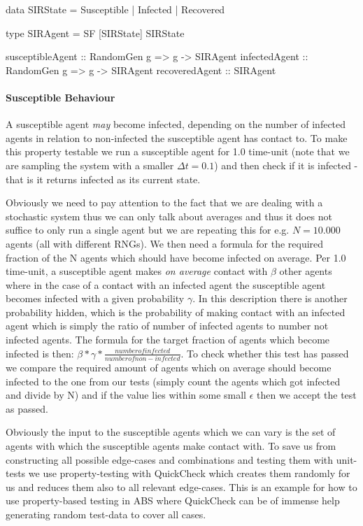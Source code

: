\begin{HaskellCode}
data SIRState 
  = Susceptible 
  | Infected 
  | Recovered
  
type SIRAgent = SF [SIRState] SIRState

susceptibleAgent :: RandomGen g => g -> SIRAgent
infectedAgent :: RandomGen g => g -> SIRAgent
recoveredAgent :: SIRAgent
\end{HaskellCode}

\paragraph{Susceptible Behaviour}
A susceptible agent \textit{may} become infected, depending on the number of infected agents in relation to non-infected the susceptible agent has contact to. To make this property testable we run a susceptible agent for 1.0 time-unit (note that we are sampling the system with a smaller $\Delta t = 0.1$) and then check if it is infected - that is it returns infected as its current state.

Obviously we need to pay attention to the fact that we are dealing with a stochastic system thus we can only talk about averages and thus it does not suffice to only run a single agent but we are repeating this for e.g. $N = 10.000$ agents (all with different RNGs). We then need a formula for the required fraction of the N agents which should have become infected on average. Per 1.0 time-unit, a susceptible agent makes \textit{on average} contact with $\beta$ other agents where in the case of a contact with an infected agent the susceptible agent becomes infected with a given probability $\gamma$. In this description there is another probability hidden, which is the probability of making contact with an infected agent which is simply the ratio of number of infected agents to number not infected agents. The formula for the target fraction of agents which become infected is then: $\beta * \gamma * \frac{number of infected}{number of non-infected}$. To check whether this test has passed we compare the required amount of agents which on average should become infected to the one from our tests (simply count the agents which got infected and divide by N) and if the value lies within some small $\epsilon$ then we accept the test as passed.

Obviously the input to the susceptible agents which we can vary is the set of agents with which the susceptible agents make contact with. To save us from constructing all possible edge-cases and combinations and testing them with unit-tests we use property-testing with QuickCheck which creates them randomly for us and reduces them also to all relevant edge-cases. This is an example for how to use property-based testing in ABS where QuickCheck can be of immense help generating random test-data to cover all cases.


